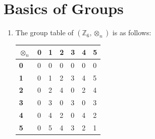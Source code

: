 \section{Basics of Groups}
\begin{enumerate}
    \item The group table of $(\mathbb{Z}_6, \otimes_n)$ is as follows:

    \begin{table}[h]
        \centering
        \begin{tabular}{|l|l|l|l|l|l|l|}
        \hline
        \textbf{$\otimes_n$} & \textbf{0} & \textbf{1} & \textbf{2} & \textbf{3} & \textbf{4} & \textbf{5} \\ \hline
        \textbf{0}       & 0          & 0          & 0          & 0          & 0          & 0          \\ \hline
        \textbf{1}       & 0          & 1          & 2          & 3          & 4          & 5          \\ \hline
        \textbf{2}       & 0          & 2          & 4          & 0          & 2          & 4          \\ \hline
        \textbf{3}       & 0          & 3          & 0          & 3          & 0          & 3          \\ \hline
        \textbf{4}       & 0          & 4          & 2          & 0          & 4          & 2          \\ \hline
        \textbf{5}       & 0          & 5          & 4          & 3          & 2          & 1          \\ \hline
        \end{tabular}
    \end{table}


\end{enumerate}
